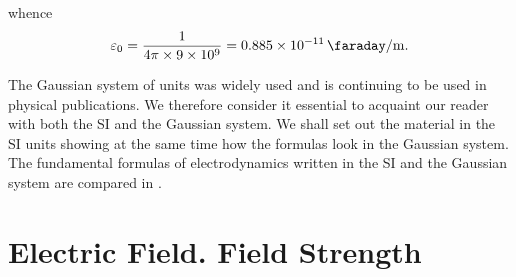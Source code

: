 \noindent
whence
\begin{equation}\label{eq:1_12}
	\varepsilon_0 = \frac{1}{4\pi\times\num{9e9}} = \SI{0.885e-11}{\faraday\per\metre}.
\end{equation}

The Gaussian system of units was widely used and is continuing to be used in physical publications. We therefore consider it essential to acquaint our reader with both the SI and the Gaussian system. We shall set out the material in the SI units showing at the same time how the formulas look in the Gaussian system. The fundamental formulas of electrodynamics written in the SI and the Gaussian system are compared in .

\section{Electric Field. Field Strength}\label{sec:1_5}
